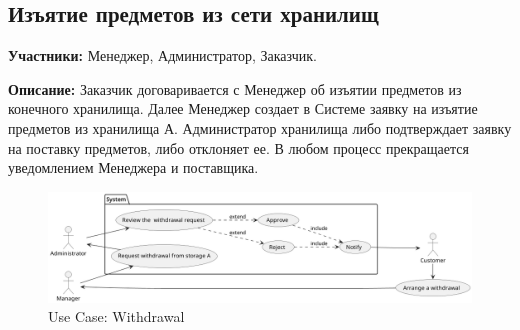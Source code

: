 
\subsection{Изъятие предметов из сети хранилищ}

\textbf{Участники:}
Менеджер, Администратор, Заказчик.

\textbf{Описание:}
Заказчик договаривается с Менеджер об
изъятии предметов из конечного хранилища. Далее Менеджер 
создает в Системе заявку на изъятие предметов из 
хранилища А. Администратор хранилища либо подтверждает 
заявку на поставку предметов, либо отклоняет ее. В 
любом процесс прекращается уведомлением Менеджера и 
поставщика.

\begin{figure}[h]
  \centering
  \includegraphics[width=12cm]{../../out/spec/figure/usecase/withdrawal_confirm/Storage Net, Use Case, Withdrawal.png}
  \caption{Use Case: Withdrawal}
\end{figure}
